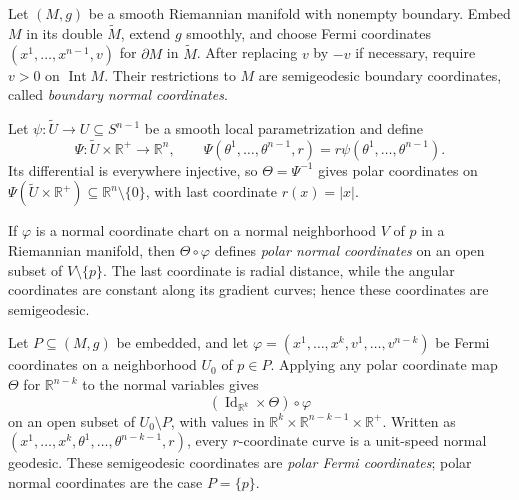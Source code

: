 \begin{example}
\label{ex:boundary-normal-coordinates}


Let $(M,g)$ be a smooth Riemannian manifold with nonempty boundary. Embed $M$
in its double $\widetilde M$, extend $g$ smoothly, and choose Fermi coordinates
$(x^1,\ldots,x^{n-1},v)$ for $\partial M$ in $\widetilde M$. After replacing
$v$ by $-v$ if necessary, require $v>0$ on $\operatorname{Int}M$. Their
restrictions to $M$ are semigeodesic boundary coordinates, called
\emph{boundary normal coordinates}.
\end{example}

\begin{example}
\label{ex:polar-normal-coordinates}

Let $\psi:\widetilde U\to U\subseteq S^{n-1}$ be a smooth local
parametrization and define
\[
\Psi:\widetilde U\times\mathbb R^+\to\mathbb R^n,
\qquad
\Psi(\theta^1,\ldots,\theta^{n-1},r)=r\psi(\theta^1,\ldots,\theta^{n-1}).
\]
Its differential is everywhere injective, so $\Theta=\Psi^{-1}$ gives polar
coordinates on
$\Psi(\widetilde U\times\mathbb R^+)\subseteq\mathbb R^n\setminus\{0\}$,
with last coordinate $r(x)=|x|$.

If $\varphi$ is a normal coordinate chart on a normal neighborhood $V$ of
$p$ in a Riemannian manifold, then $\Theta\circ\varphi$ defines
\emph{polar normal coordinates} on an open subset of $V\setminus\{p\}$. The
last coordinate is radial distance, while the angular coordinates are constant
along its gradient curves; hence these coordinates are semigeodesic.
\end{example}

\begin{example}
\label{ex:polar-fermi-coordinates}


Let $P\subseteq(M,g)$ be embedded, and let
$\varphi=(x^1,\ldots,x^k,v^1,\ldots,v^{n-k})$ be Fermi coordinates on a
neighborhood $U_0$ of $p\in P$. Applying any polar coordinate map $\Theta$
for $\mathbb R^{n-k}$ to the normal variables gives
\[
(\operatorname{Id}_{\mathbb R^k}\times\Theta)\circ\varphi
\]
on an open subset of $U_0\setminus P$, with values in
$\mathbb R^k\times\mathbb R^{n-k-1}\times\mathbb R^+$. Written as
$(x^1,\ldots,x^k,\theta^1,\ldots,\theta^{n-k-1},r)$, every $r$-coordinate
curve is a unit-speed normal geodesic. These semigeodesic coordinates are
\emph{polar Fermi coordinates}; polar normal coordinates are the case
$P=\{p\}$.
\end{example}
